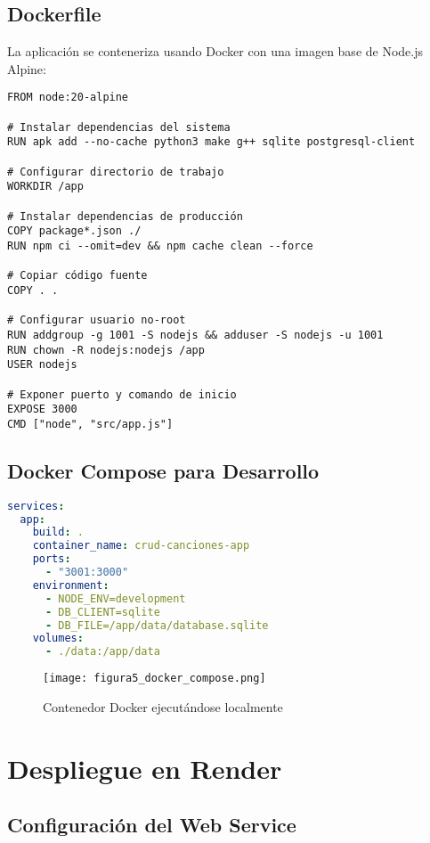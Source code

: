 \documentclass[12pt,a4paper]{article}
\begin{document}
\subsection{Dockerfile}

La aplicación se conteneriza usando Docker con una imagen base de Node.js Alpine:

\begin{lstlisting}[caption=Configuración Docker]
FROM node:20-alpine

# Instalar dependencias del sistema
RUN apk add --no-cache python3 make g++ sqlite postgresql-client

# Configurar directorio de trabajo
WORKDIR /app

# Instalar dependencias de producción
COPY package*.json ./
RUN npm ci --omit=dev && npm cache clean --force

# Copiar código fuente
COPY . .

# Configurar usuario no-root
RUN addgroup -g 1001 -S nodejs && adduser -S nodejs -u 1001
RUN chown -R nodejs:nodejs /app
USER nodejs

# Exponer puerto y comando de inicio
EXPOSE 3000
CMD ["node", "src/app.js"]
\end{lstlisting}

\subsection{Docker Compose para Desarrollo}

\begin{lstlisting}[language=yaml, caption=Configuración Docker Compose]
services:
  app:
    build: .
    container_name: crud-canciones-app
    ports:
      - "3001:3000"
    environment:
      - NODE_ENV=development
      - DB_CLIENT=sqlite
      - DB_FILE=/app/data/database.sqlite
    volumes:
      - ./data:/app/data
\end{lstlisting}

\begin{figure}[H]
\centering
\texttt{[image: figura5\_docker\_compose.png]}
\caption{Contenedor Docker ejecutándose localmente}
\end{figure}

\section{Despliegue en Render}

\subsection{Configuración del Web Service}
\end{document}
